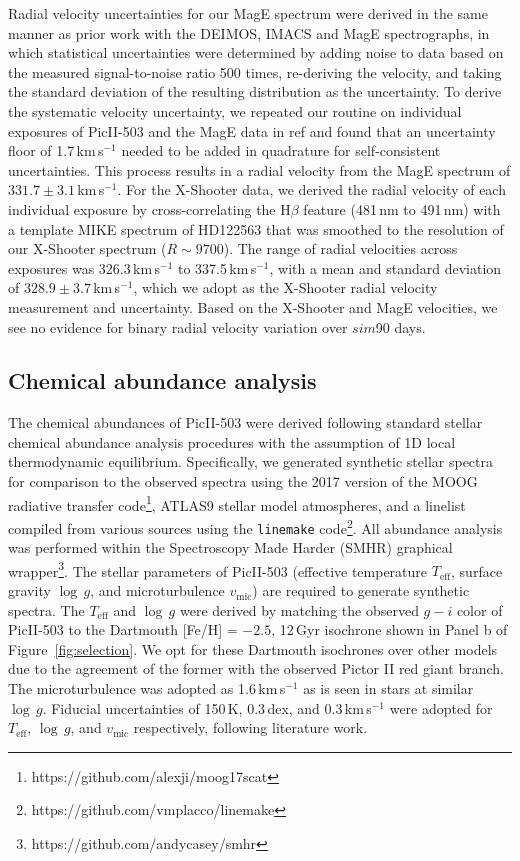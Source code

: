 \documentclass[pdflatex,sn-nature]{sn-jnl}%
\theoremstyle{thmstyleone}%
\theoremstyle{thmstyletwo}%
\theoremstyle{thmstylethree}%
\begin{document}
Radial velocity uncertainties for our MagE spectrum were derived in the same manner as prior work with the DEIMOS, IMACS and MagE spectrographs\cite{sg+07, sld+17, lsd+17, cfs+21}, in which statistical uncertainties were determined by adding noise to data based on the measured signal-to-noise ratio 500 times, re-deriving the velocity, and taking the standard deviation of the resulting distribution as the uncertainty.
To derive the systematic velocity uncertainty, we repeated our routine on individual exposures of PicII-503 and the MagE data in ref\cite{cfs+21} and found that an uncertainty floor of 1.7\,km\,s$^{-1}$ needed to be added in quadrature for self-consistent uncertainties.
This process results in a radial velocity from the MagE spectrum of $331.7 \pm 3.1$\,km\,s$^{-1}$.
For the X-Shooter data, we derived the radial velocity of each individual exposure by cross-correlating the H$\beta$ feature (481\,nm to 491\,nm) with a template MIKE spectrum of HD122563 that was smoothed to the resolution of our X-Shooter spectrum ($R\sim9700$). 
The range of radial velocities across exposures was 326.3\,km\,s$^{-1}$ to 337.5\,km\,s$^{-1}$, with a mean and standard deviation of $328.9\pm3.7$\,km\,s$^{-1}$, which we adopt as the X-Shooter radial velocity measurement and uncertainty. 
Based on the X-Shooter and MagE velocities, we see no evidence for binary radial velocity variation over $sim$90 days.

\subsection*{Chemical abundance analysis}

The chemical abundances of PicII-503 were derived following standard stellar chemical abundance analysis procedures with the assumption of 1D local thermodynamic equilibrium.
Specifically, we generated synthetic stellar spectra for comparison to the observed spectra using the 2017 version of the MOOG radiative transfer code\cite{s+73,sks+11}\footnote{https://github.com/alexji/moog17scat}, ATLAS9 stellar model atmospheres\cite{ck+03,k+05}, and a linelist compiled from various sources\cite{mpv+14, slr+14, rdl+14, drl+14, bpr+17,phn+17,nist,dls+21} using the \texttt{linemake} code\cite{psr+21}\footnote{https://github.com/vmplacco/linemake}.
All abundance analysis was performed within the Spectroscopy Made Harder (SMHR) graphical wrapper\cite{c+14}\footnote{https://github.com/andycasey/smhr}.
The stellar parameters of PicII-503 (effective temperature $T_{\text{eff}}$, surface gravity $\log\,g$, and microturbulence $v_{\text{mic}}$) are required to generate synthetic spectra.
The $T_{\text{eff}}$ and $\log\,g$ were derived by matching the observed $g-i$ color of PicII-503 to the Dartmouth [Fe/H] = $-2.5$, 12\,Gyr isochrone shown in Panel b of Figure~\ref{fig:selection}.
We opt for these Dartmouth isochrones over other models due to the agreement of the former with the observed Pictor II red giant branch.
The microturbulence was adopted as 1.6\,km\,s$^{-1}$ as is seen in stars at similar $\log\,g$\cite{fcj+13}.
Fiducial uncertainties of 150\,K, 0.3\,dex, and 0.3\,km\,s$^{-1}$ were adopted for $T_{\text{eff}}$, $\log\,g$, and $v_{\text{mic}}$ respectively, following literature work\cite{fcj+13, cfs+21}.
\end{document}

